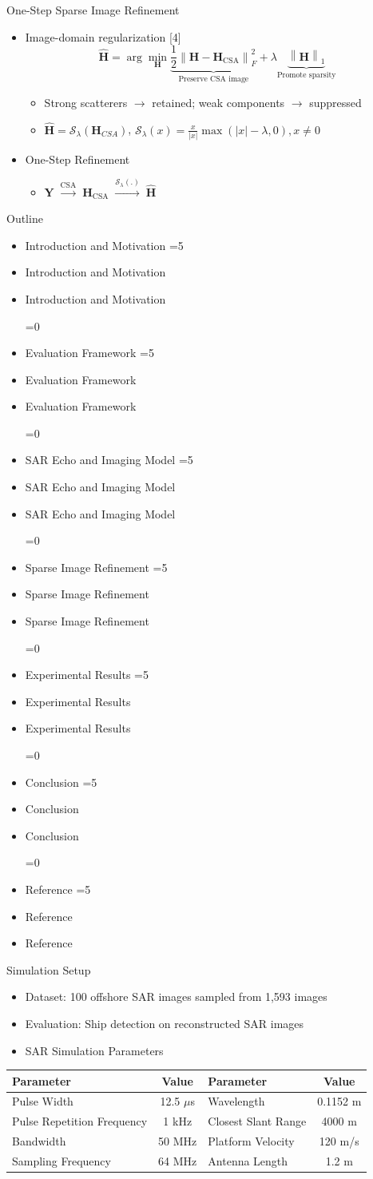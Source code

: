 \documentclass[aspectratio=169, 11pt]{beamer}
\newcommand{\dsrlabActiveSec}{0}
\newcommand{\dsrlaboutlineitem}[2]{%
  \ifnum\dsrlabActiveSec=0
    \item #2
  \else
    \ifnum#1=\dsrlabActiveSec
      \item #2
    \else
      \item {\color{dsrlabGrayLabel}#2}
    \fi
  \fi
}
\newcommand{\dsrlabSectionOutline}[1]{%
  \renewcommand{\dsrlabActiveSec}{#1}%
  \begin{frame}{Outline}
    \begin{itemize}
      \dsrlaboutlineitem{1}{Introduction and Motivation}
      \dsrlaboutlineitem{2}{Evaluation Framework}
      \dsrlaboutlineitem{3}{SAR Echo and Imaging Model}
      \dsrlaboutlineitem{4}{Sparse Image Refinement}
      \dsrlaboutlineitem{5}{Experimental Results}
      \dsrlaboutlineitem{6}{Conclusion}
      \dsrlaboutlineitem{7}{Reference}
    \end{itemize}
  \end{frame}
}
\begin{document}
\begin{frame}{One-Step Sparse Image Refinement}
  \begin{itemize}
    \item Image-domain regularization [4]
    $$
    \hat{\mathbf{H}}=\arg\min_{\mathbf{H}}
    \underbrace{\frac{1}{2}\left\|\mathbf{H}-\mathbf{H}_{\mathrm{CSA}}\right\|_F^2}_{\text{Preserve CSA image}}
    +\lambda\underbrace{\left\|\mathbf{H}\right\|_1}_{\text{Promote sparsity}}
    $$
    \vspace{-0.4cm}
    \begin{itemize}
      \item Strong scatterers $\rightarrow$ retained; weak components $\rightarrow$ suppressed
      \item $\hat{\mathbf{H}}=\mathcal{S}_{\lambda}(\mathbf{H}_{CSA})$,
            $\mathcal{S}_{\lambda}(x)=\frac{x}{|x|}\max(|x|-\lambda,0),x\neq0$
    \end{itemize}
    \item One-Step Refinement
      \begin{itemize}
        \item $\mathbf{Y}\;\xrightarrow{\mathrm{CSA}}\;\mathbf{H}_{\mathrm{CSA}}
              \;\xrightarrow{\mathcal{S}_{\lambda}(.)}\;\hat{\mathbf{H}}$
      \end{itemize}
  \end{itemize}
\end{frame}

\dsrlabSectionOutline{5}

\begin{frame}{Simulation Setup}
  \begin{itemize}
    \item Dataset: 100 offshore SAR images sampled from 1,593 images
    \item Evaluation: Ship detection on reconstructed SAR images
    \item SAR Simulation Parameters
  \end{itemize}
  \begin{center}
    \renewcommand{\arraystretch}{1.3}
    \begin{tabular}{|l|c|l|c|}
      \hline
      \textbf{Parameter} & \textbf{Value} & \textbf{Parameter} & \textbf{Value} \\
      \hline
      Pulse Width & 12.5 $\mu$s & Wavelength & 0.1152 m \\
      \hline
      Pulse Repetition Frequency & 1 kHz & Closest Slant Range & 4000 m \\
      \hline
      Bandwidth & 50 MHz & Platform Velocity & 120 m/s \\
      \hline
      Sampling Frequency & 64 MHz & Antenna Length & 1.2 m \\
      \hline
    \end{tabular}
  \end{center}
\end{frame}
\end{document}
